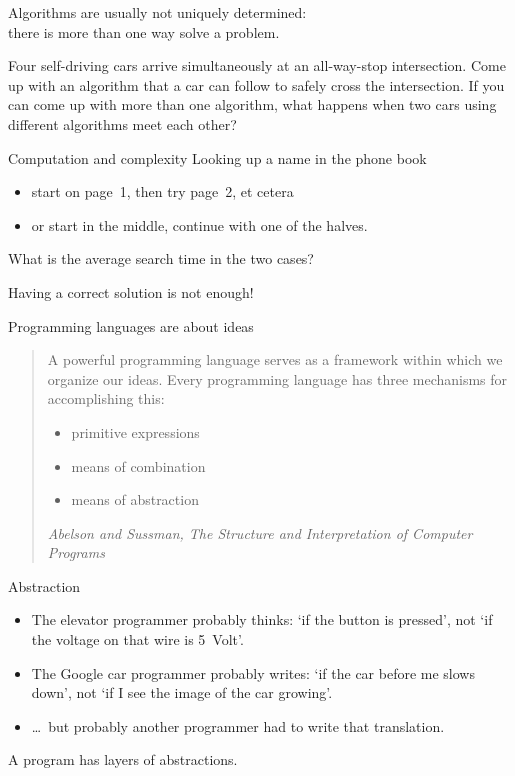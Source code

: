\begin{exercise}
  \label{ex:googlecar}
  Algorithms are usually not uniquely determined:\\
  there is more than one way solve a problem.

  Four self-driving cars arrive simultaneously at an all-way-stop intersection. Come
  up with an algorithm that a car can follow to safely cross the
  intersection. If you can come up with more than one algorithm, what
  happens when two cars using different algorithms meet each other?
\end{exercise}

\begin{block}{Computation and complexity}
  \label{sl:phonebook}
  Looking up a name in the phone book
  \begin{itemize}
  \item start on page~1, then try page~2, et cetera
  \item or start in the middle, continue with one of the halves.
  \end{itemize}
  What is the average search time in the two cases?

  Having a  correct solution is not enough!
\end{block}

\begin{block}{Programming languages are about ideas}
  \label{sl:sussman}
  \begin{quotation}
    \raggedright\noindent
    A powerful programming language serves as a framework within which
    we organize our ideas. Every programming language has three
    mechanisms for accomplishing this:
    \begin{itemize}
    \item primitive expressions
    \item means of combination
    \item means of abstraction
    \end{itemize}
    \textsl{Abelson and Sussman, The Structure and Interpretation of
      Computer Programs}
  \end{quotation}
\end{block}

\begin{block}{Abstraction}
  \label{sl:abstraction}
  \begin{itemize}
  \item The elevator programmer probably thinks: `if the button is
    pressed', not `if the voltage on that wire is 5~Volt'.
  \item The Google car programmer probably writes: `if the car before me
    slows down', not `if I see the image of the car growing'.
  \item \ldots~but probably another programmer had to write that translation.
  \end{itemize}
  A program has layers of abstractions.
\end{block}

